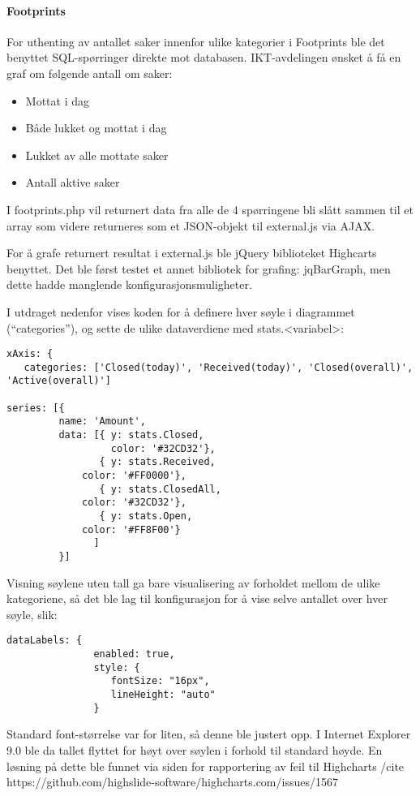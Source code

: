 \paragraph{Footprints}

For uthenting av antallet saker innenfor ulike kategorier i Footprints ble det benyttet SQL-spørringer direkte mot databasen. IKT-avdelingen ønsket å få en graf om følgende antall om saker:
\begin{itemize}
	\item Mottat i dag
	\item Både lukket og mottat i dag
	\item Lukket av alle mottate saker
	\item Antall aktive saker
\end{itemize}

I footprints.php vil returnert data fra alle de 4 spørringene bli slått sammen til et array som videre returneres som et JSON-objekt til external.js via AJAX. 

For å grafe returnert resultat i external.js ble jQuery biblioteket Highcarts benyttet. Det ble først testet et annet bibliotek for grafing: jqBarGraph, men dette hadde manglende konfigurasjonsmuligheter.  

I utdraget nedenfor vises koden for å definere hver søyle i diagrammet (“categories”), og sette de ulike dataverdiene med stats.<variabel>:
\begin{lstlisting}
xAxis: {
   categories: ['Closed(today)', 'Received(today)', 'Closed(overall)', 'Active(overall)']

series: [{
         name: 'Amount',
         data: [{ y: stats.Closed,
                  color: '#32CD32'},
                { y: stats.Received,
             color: '#FF0000'},
                { y: stats.ClosedAll,
             color: '#32CD32'},
                { y: stats.Open,
             color: '#FF8F00'}
               ]
         }]
\end{lstlisting}

Visning søylene uten tall ga bare visualisering av forholdet mellom de ulike kategoriene, så det ble lag til konfigurasjon for å vise selve antallet over hver søyle, slik: 

\begin{lstlisting}
dataLabels: {
               enabled: true,
               style: {
                  fontSize: "16px",
                  lineHeight: "auto"
               }
\end{lstlisting}

Standard font-størrelse var for liten, så denne ble justert opp. I Internet Explorer 9.0 ble da tallet flyttet for høyt over søylen i forhold til standard høyde. En løsning på dette ble funnet via siden for rapportering av feil til Highcharts /cite https://github.com/highslide-software/highcharts.com/issues/1567


